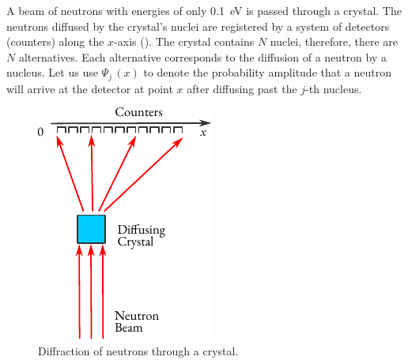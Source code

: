  A beam of neutrons with energies of only \SI{0.1}{\eV} is passed through a crystal. The neutrons diffused by the crystal's nuclei are registered by a system of detectors (counters) along the $x$-axis (). The crystal contains $N$ nuclei, therefore, there are $N$ alternatives. Each alternative corresponds to the diffusion of a neutron by a nucleus. Let us use $ \Psi_{j} \, (x)$ to denote the probability amplitude that a neutron will arrive at the detector at point $x$ after diffusing past the $j$-th nucleus.
\begin{figure}
\centering
\includegraphics[width=0.9\linewidth]{figures/neutron-diff.pdf}
\caption{Diffraction of neutrons through a crystal.\label{neutron-diff}}
\end{figure}

